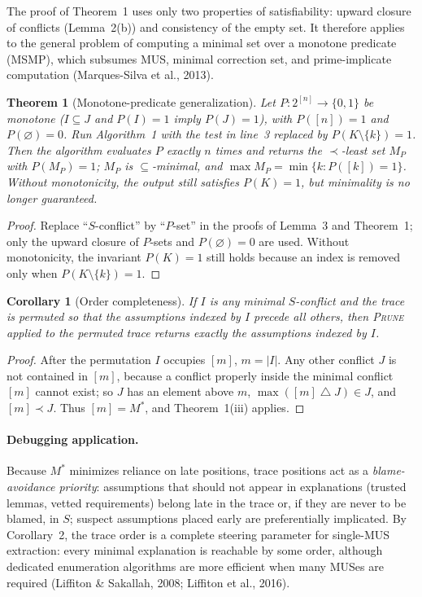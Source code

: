 \documentclass[11pt,reqno]{amsart}
\theoremstyle{plain}
\newtheorem{theorem}{Theorem}
\newtheorem{corollary}{Corollary}
\theoremstyle{definition}
\newcommand{\Mstar}{M^{*}}
\newcommand{\sd}{\mathbin{\triangle}}        %
\newcommand{\PRUNE}{\textsc{Prune}}
\begin{document}
The proof of Theorem~1 uses only two properties of satisfiability: upward closure
of conflicts (Lemma~2(b)) and consistency of the empty set. It therefore applies to
the general problem of computing a minimal set over a monotone predicate (MSMP),
which subsumes MUS, minimal correction set, and prime-implicate computation
(Marques-Silva et al., 2013).

\begin{theorem}[Monotone-predicate generalization]
Let $P\colon2^{[n]}\to\{0,1\}$ be monotone ($I\subseteq J$ and $P(I)=1$ imply
$P(J)=1$), with $P([n])=1$ and $P(\varnothing)=0$. Run Algorithm~1 with the test in
line~3 replaced by $P(K\setminus\{k\})=1$. Then the algorithm evaluates $P$ exactly
$n$ times and returns the $\prec$-least set $M_P$ with $P(M_P)=1$; $M_P$ is
$\subseteq$-minimal, and $\max M_P=\min\{k:P([k])=1\}$. Without monotonicity, the
output still satisfies $P(K)=1$, but minimality is no longer guaranteed.
\end{theorem}
\begin{proof}
Replace ``$S$-conflict'' by ``$P$-set'' in the proofs of Lemma~3 and Theorem~1;
only the upward closure of $P$-sets and $P(\varnothing)=0$ are used. Without
monotonicity, the invariant $P(K)=1$ still holds because an index is removed only
when $P(K\setminus\{k\})=1$.
\end{proof}

\begin{corollary}[Order completeness]
If $I$ is any minimal $S$-conflict and the trace is permuted so that the
assumptions indexed by $I$ precede all others, then \PRUNE{} applied to the
permuted trace returns exactly the assumptions indexed by $I$.
\end{corollary}
\begin{proof}
After the permutation $I$ occupies $[m]$, $m=|I|$. Any other conflict $J$ is not
contained in $[m]$, because a conflict properly inside the minimal conflict $[m]$
cannot exist; so $J$ has an element above $m$, $\max([m]\sd J)\in J$, and
$[m]\prec J$. Thus $[m]=\Mstar$, and Theorem~1(iii) applies.
\end{proof}

\paragraph{Debugging application.} Because $\Mstar$ minimizes reliance on late
positions, trace positions act as a \emph{blame-avoidance priority}: assumptions
that should not appear in explanations (trusted lemmas, vetted requirements) belong
late in the trace or, if they are never to be blamed, in $S$; suspect assumptions
placed early are preferentially implicated. By Corollary~2, the trace order is a
complete steering parameter for single-MUS extraction: every minimal explanation is
reachable by some order, although dedicated enumeration algorithms are more
efficient when many MUSes are required (Liffiton \& Sakallah, 2008; Liffiton et
al., 2016).
\end{document}
